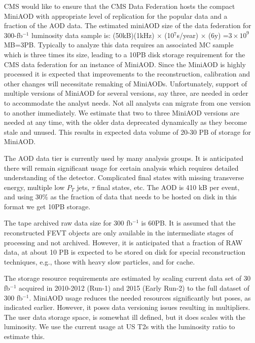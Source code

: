 \documentclass[11pt,a4paper]{article}
\begin{document}
CMS would like to ensure that the CMS Data Federation hosts the
compact MiniAOD with appropriate level of replication for the popular
data and a fraction of the AOD data.  The estimated miniAOD size of
the data federation for 300-fb$^{-1}$ luminosity data sample is:
(50kB)(1kHz) $\times$ (10$^7$s/year) $\times$ (6y) =$3 \times 10^9$
MB=3PB.  Typically to analyze
this data requires an associated MC sample which is three times its
size, leading to a 10PB disk storage requirement for the CMS data
federation for an instance of MiniAOD. Since the MiniAOD is highly
processed it is expected that improvements to the reconstruction,
calibration and other changes will necessitate remaking of MiniAODs.
Unfortunately, support of multiple versions of MiniAOD for several
versions, say three, are needed in order to accommodate the analyst
needs.  Not all analysts can migrate from one version to another
immediately.  We estimate that two to three MiniAOD versions are
needed at any time, with the older data deprecated dynamically as they
become stale and unused.  This results in expected data volume of
20-30 PB of storage for MiniAOD.

The AOD data tier is currently used by many analysis groups.  It is
anticipated there will remain significant usage for certain analysis
which requires detailed understanding of the detector.  Complicated
final states with missing transverse energy, multiple low $P_T$ jets,
$\tau$ final states, etc.  The AOD is 410 kB per event, and using 30\%
as the fraction of data that needs to be hosted on disk in this format
we get 10PB storage.

The tape archived raw data size for 300 fb$^{-1}$ is 60PB.  It is
assumed that the reconstructed FEVT objects are only available in the
intermediate stages of processing and not archived.  However, it is
anticipated that a fraction of RAW data, at about 10 PB is expected to
be stored on disk for special reconstruction techniques, e.g., those
with heavy slow particles, and for cache.

The storage resource requirements are estimated by scaling current
data set of 30 fb$^{-1}$ acquired in 2010-2012 (Run-1) and 2015 (Early
Run-2) to the full dataset of 300 fb$^{-1}$.  MiniAOD usage reduces
the needed resources significantly but poses, as indicated earlier.
However, it poses data versioning issues resulting in multipliers.
The user data storage space, is somewhat ill defined, but it does
scales with the luminosity. We use the current usage at US T2s with
the luminosity ratio to estimate this.
\end{document}

